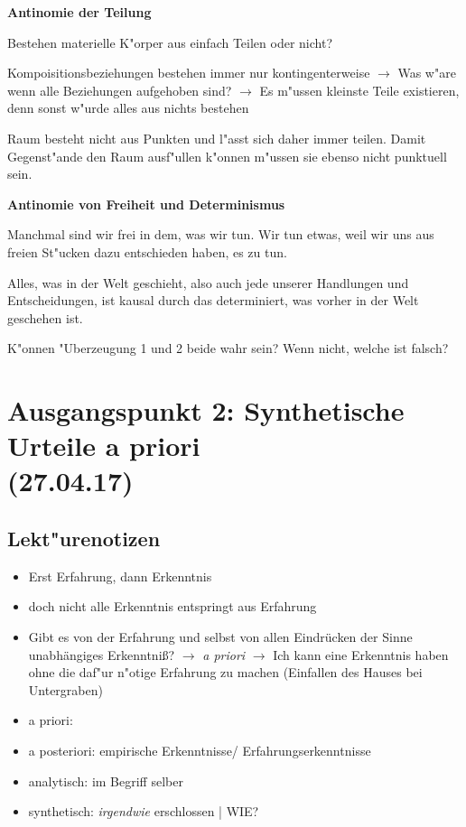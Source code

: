 \documentclass[emulatestandardclasses]{scrartcl}
\begin{document}
\textbf{Antinomie der Teilung}

\begin{description}[leftmargin=!,labelwidth=\widthof{\bfseries Contra-Argument}]
  \item[Frage] Bestehen materielle K"orper aus einfach Teilen oder nicht?
  \item[Pro-Argument] Kompoisitionsbeziehungen bestehen immer nur kontingenterweise $\rightarrow$ Was w"are wenn alle Beziehungen aufgehoben sind? $\rightarrow$ Es m"ussen kleinste Teile existieren, denn sonst w"urde alles aus nichts bestehen
  \item[Contra-Argument] Raum besteht nicht aus Punkten und l"asst sich daher immer teilen. Damit Gegenst"ande den Raum ausf"ullen k"onnen m"ussen sie ebenso nicht punktuell sein.
\end{description}
\vspace{9pt}
\noindent \textbf{Antinomie von Freiheit und Determinismus}

\begin{description}[leftmargin=!,labelwidth=\widthof{\bfseries "Uberzeugung 2}]
  \item["Uberzeugung 1] Manchmal sind wir frei in dem, was wir tun. Wir tun
etwas, weil wir uns aus freien St"ucken dazu entschieden haben, es zu tun.
  \item["Uberzeugung 2] Alles, was in der Welt geschieht, also auch jede unserer Handlungen und Entscheidungen, ist kausal durch das determiniert, was vorher in der Welt geschehen ist.
  \item[Frage] K"onnen "Uberzeugung 1 und 2 beide wahr sein? Wenn nicht, welche ist falsch?
\end{description}


\section{Ausgangspunkt 2: Synthetische Urteile a priori\\(27.04.17)}

\subsection{Lekt"urenotizen}

\begin{itemize}
  \item Erst Erfahrung, dann Erkenntnis
  \item doch nicht alle Erkenntnis entspringt aus Erfahrung
  \item Gibt es von der Erfahrung und selbst von allen Eindrücken der Sinne unabhängiges Erkenntniß? $\rightarrow$ \emph{a priori} $\rightarrow$ Ich kann eine Erkenntnis haben ohne die daf"ur n"otige Erfahrung zu machen (Einfallen des Hauses bei Untergraben)
  \item a priori:
  \item a posteriori: empirische Erkenntnisse/ Erfahrungserkenntnisse
  \item analytisch: im Begriff selber
  \item synthetisch: \emph{irgendwie} erschlossen | WIE?
\end{itemize}
\end{document}

